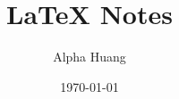 \documentclass[openany]{book}
\title{LaTeX Notes}
\author{Alpha Huang}
\date{\today}
\begin{document}
\maketitle
\tableofcontents
\let\cleardoublepage\clearpage







\end{document}
